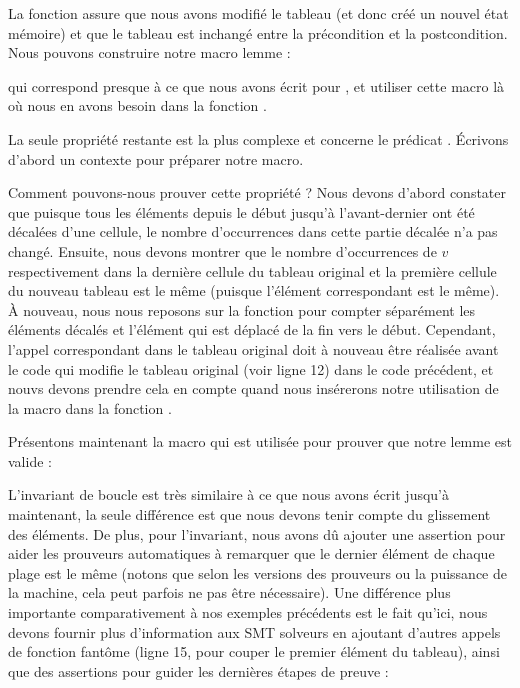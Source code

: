

La fonction  assure que nous avons
modifié le tableau (et donc créé un nouvel état mémoire) et que le tableau est
inchangé entre la précondition et la postcondition. Nous pouvons construire
notre macro lemme :




qui correspond presque à ce que nous avons écrit pour ,
et utiliser cette macro là où nous en avons besoin dans la fonction
.




La seule propriété restante est la plus complexe et concerne le prédicat
. Écrivons d'abord un contexte pour préparer notre
macro.




Comment pouvons-nous prouver cette propriété ? Nous devons d'abord constater
que puisque tous les éléments depuis le début jusqu'à l'avant-dernier ont été
décalées d'une cellule, le nombre d'occurrences dans cette partie décalée n'a
pas changé. Ensuite, nous devons montrer que le nombre d'occurrences de $v$
respectivement dans la dernière cellule du tableau original et la première
cellule du nouveau tableau est le même (puisque l'élément correspondant est le
même). À nouveau, nous nous reposons sur la fonction  pour compter
séparément les éléments décalés et l'élément qui est déplacé de la fin vers le
début. Cependant, l'appel correspondant dans le tableau original doit à nouveau
être réalisée avant le code qui modifie le tableau original (voir ligne 12) dans
le code précédent, et nouvs devons prendre cela en compte quand nous insérerons
notre utilisation de la macro dans la fonction .


Présentons maintenant la macro qui est utilisée pour prouver que notre lemme
est valide :




L'invariant de boucle est très similaire à ce que nous avons écrit jusqu'à
maintenant, la seule différence est que nous devons tenir compte du glissement
des éléments. De plus, pour l'invariant, nous avons dû ajouter une assertion
pour aider les prouveurs automatiques à remarquer que le dernier élément de
chaque plage est le même (notons que selon les versions des prouveurs ou la
puissance de la machine, cela peut parfois ne pas être nécessaire). Une différence
plus importante comparativement à nos exemples précédents est le fait qu'ici, nous
devons fournir plus d'information aux SMT solveurs en ajoutant d'autres appels
de fonction fantôme (ligne 15, pour couper le premier élément du tableau), ainsi
que des assertions pour guider les dernières étapes de preuve :


